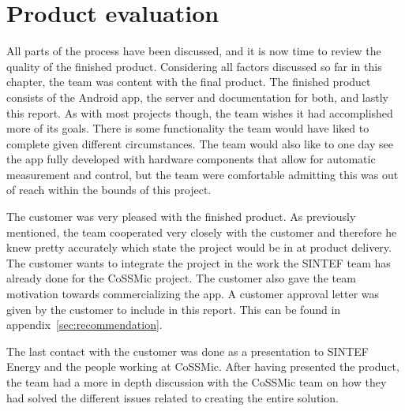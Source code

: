\section{Product evaluation} 
All parts of the process have been discussed, and it is now time to review the quality of the finished product. Considering all factors discussed so far in this chapter, the team was content with the final product. The finished product consists of the Android app, the server and documentation for both, and lastly this report. As with most projects though, the team wishes it had accomplished more of its goals. There is some functionality the team would have liked to complete given different circumstances. The team would also like to one day see the app fully developed with hardware components that allow for automatic measurement and control, but the team were comfortable admitting this was out of reach within the bounds of this project. 

The customer was very pleased with the finished product. As previously mentioned, the team cooperated very closely with the customer and therefore he knew pretty accurately which state the project would be in at product delivery. The customer wants to integrate the project in the work the SINTEF team has already done for the CoSSMic project. The customer also gave the team motivation towards commercializing the app. A customer approval letter was given by the customer to include in this report. This can be found in appendix~\ref{sec:recommendation}.

The last contact with the customer was done as a presentation to SINTEF Energy and the people working at CoSSMic. After having presented the product, the team had a more in depth discussion with the CoSSMic team on how they had solved the different issues related to creating the entire solution. 
